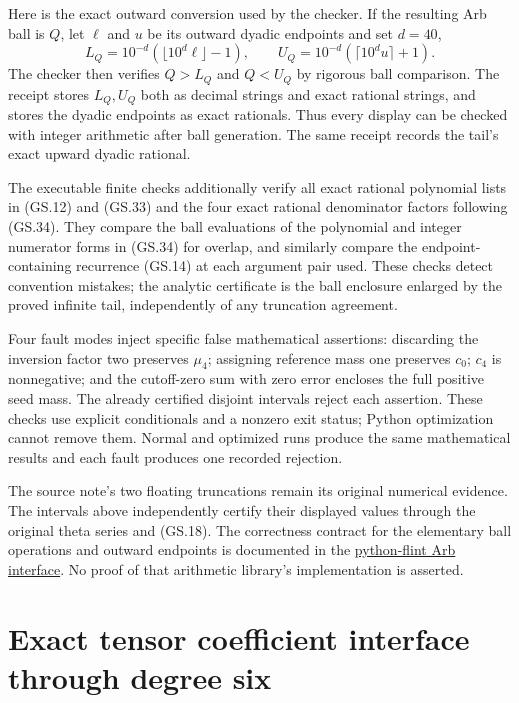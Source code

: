 \documentclass[11pt]{article}
\begin{document}
Here is the exact outward conversion used by the checker. If the
resulting Arb ball is $Q$, let $\ell$ and $u$ be its outward
dyadic endpoints and set $d=40$,
\begin{equation}
 L_Q=10^{-d}(\lfloor10^d\ell\rfloor-1),\qquad
 U_Q=10^{-d}(\lceil10^d u\rceil+1).\tag{GS.37}
\end{equation}
The checker then verifies $Q>L_Q$ and $Q<U_Q$ by rigorous ball
comparison. The receipt stores $L_Q,U_Q$ both as decimal strings
and exact rational strings, and stores the dyadic endpoints as
exact rationals. Thus every display can be checked with integer
arithmetic after ball generation. The same receipt records the
tail's exact upward dyadic rational.

The executable finite checks additionally verify all exact rational
polynomial lists in (GS.12) and (GS.33) and the four exact rational
denominator factors following (GS.34). They compare the ball evaluations
of the polynomial and integer numerator forms in (GS.34) for overlap,
and similarly compare the endpoint-containing recurrence (GS.14)
at each argument pair used. These checks detect convention mistakes;
the analytic certificate is the ball enclosure enlarged by the
proved infinite tail, independently of any truncation agreement.

Four fault modes inject specific false mathematical assertions:
discarding the inversion factor two preserves $\mu_4$; assigning
reference mass one preserves $c_0$; $c_4$ is nonnegative; and the
cutoff-zero sum with zero error encloses the full positive seed
mass. The already certified disjoint intervals reject each assertion.
These checks use explicit conditionals and a nonzero exit status;
Python optimization cannot remove them. Normal and optimized runs
produce the same mathematical results and each fault produces one
recorded rejection.

The source note's two floating truncations remain its original
numerical evidence. The intervals above independently certify their
displayed values through the original theta series and (GS.18).
The correctness contract for the elementary ball operations and
outward endpoints is documented in the
\href{https://python-flint.readthedocs.io/en/latest/arb.html}{python-flint Arb interface}.
No proof of that arithmetic library's implementation is asserted.

\section{Exact tensor coefficient interface through degree six}
\end{document}
